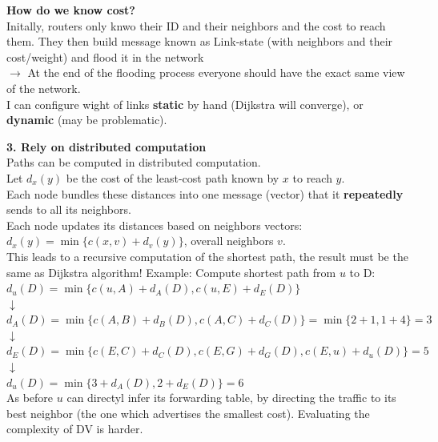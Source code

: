 \documentclass[a4paper, fontsize=8pt, landscape, DIV=1]{scrartcl}
\begin{document}
\begin{multicols*}{4}
		    \textbf{How do we know cost?}\\
		   	Initally, routers only knwo their ID and their neighbors and the cost to reach them. They then build message known as Link-state (with neighbors and their cost/weight) and flood it in the network\\
		    $\rightarrow$ At the end of the flooding process everyone should have the exact same view of the network. \\
		    I can configure wight of links \textbf{static} by hand (Dijkstra will converge), or \textbf{dynamic} (may be problematic).\par 
		    
		    \textbf{3. Rely on distributed computation}\\
		    Paths can be computed in distributed computation.\\
		    Let $d_x(y)$ be the cost of the least-cost path known by $x$ to reach $y$. \\
		    Each node bundles these distances into one message (vector) that it \textbf{repeatedly} sends to all its neighbors. \\
		    Each node updates its distances based on neighbors vectors:\\
		    $d_x(y)=\min\{c(x,v)+d_v(y)\}$, overall neighbors $v$.\\
		    This leads to a recursive computation of the shortest path, the result must be the same as Dijkstra algorithm! 
		    Example: Compute shortest path from $u$ to D:\\
		    $d_u(D)=\min\{c(u,A)+d_A(D), c(u,E)+d_E(D)\}$\\
		    $\downarrow$\\
		    $d_A(D)=\min\{c(A,B)+d_B(D), c(A,C)+d_C(D)\}=\min\{2+1,1+4\}=3$\\
		    $\downarrow$\\
		    $d_E(D)=\min\{c(E,C)+d_C(D), c(E,G)+d_G(D),c(E,u)+d_u(D)\}=5$\\
		    $\downarrow$\\
		    $d_u(D)=\min\{3+d_A(D), 2+d_E(D)\}=6$\\
		    As before $u$ can directyl infer its forwarding table, by directing the traffic to its best neighbor (the one which advertises the smallest cost). Evaluating the complexity of DV is harder. 
		    

\end{multicols*}
\end{document}
